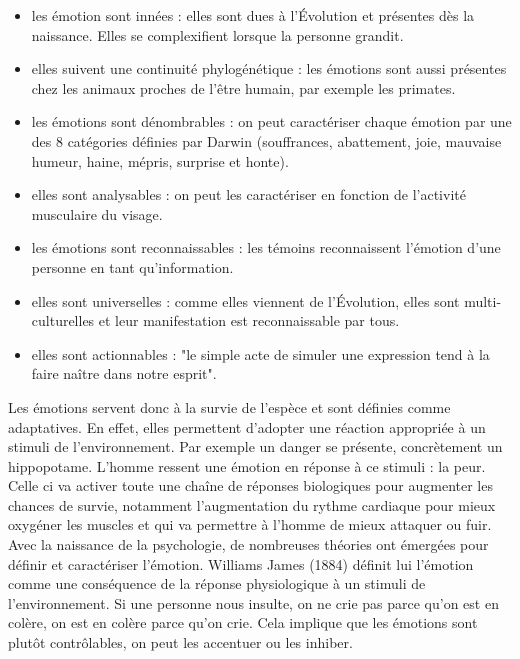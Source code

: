 \begin{itemize}
    \item les émotion sont innées : elles sont dues à l'Évolution et présentes dès la naissance. Elles se complexifient lorsque la personne grandit.
    \item elles suivent une continuité phylogénétique : les émotions sont aussi présentes chez les animaux proches de l'être humain, par exemple les primates.
    \item les émotions sont dénombrables : on peut caractériser chaque émotion par une des 8 catégories définies par Darwin (souffrances, abattement, joie, mauvaise humeur, haine, mépris, surprise et honte).
    \item elles sont analysables : on peut les caractériser en fonction de l'activité musculaire du visage.
    \item les émotions sont reconnaissables : les témoins reconnaissent l'émotion d'une personne en tant qu'information.
    \item elles sont universelles : comme elles viennent de l'Évolution, elles sont multi-culturelles et leur manifestation est reconnaissable par tous.
    \item elles sont actionnables : "le simple acte de simuler une expression tend à la faire naître dans notre esprit".
\end{itemize}
Les émotions servent donc à la survie de l’espèce et sont définies comme adaptatives. En effet, elles permettent d'adopter une réaction appropriée à un stimuli de l'environnement. Par exemple un danger se présente, concrètement un hippopotame. L'homme ressent une émotion en réponse à ce stimuli : la peur. Celle ci va activer toute une chaîne de réponses biologiques pour augmenter les chances de survie, notamment l'augmentation du rythme cardiaque pour mieux oxygéner les muscles et qui va permettre à l'homme de mieux attaquer ou fuir. \\
Avec la naissance de la psychologie, de nombreuses théories ont émergées pour définir et caractériser l'émotion. Williams James (1884) définit lui l'émotion comme une conséquence de la réponse physiologique à un stimuli de l'environnement. Si une personne nous insulte, on ne crie pas parce qu'on est en colère, on est en colère parce qu'on crie. Cela implique que les émotions sont plutôt contrôlables, on peut les accentuer ou les inhiber.
